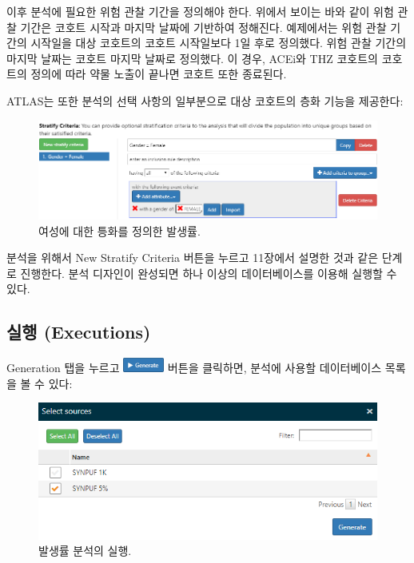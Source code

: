 \documentclass[11pt]{book}
\theoremstyle{definition}
\theoremstyle{definition}
\theoremstyle{definition}
\theoremstyle{remark}
\begin{document}
이후 분석에 필요한 위험 관찰 기간을 정의해야 한다. 위에서 보이는 바와
같이 위험 관찰 기간은 코호트 시작과 마지막 날짜에 기반하여 정해진다.
예제에서는 위험 관찰 기간의 시작일을 대상 코호트의 코호트 시작일보다 1일
후로 정의했다. 위험 관찰 기간의 마지막 날짜는 코호트 마지막 날짜로
정의했다. 이 경우, ACEi와 THZ 코호트의 코호트의 정의에 따라 약물 노출이
끝나면 코호트 또한 종료된다.

ATLAS는 또한 분석의 선택 사항의 일부분으로 대상 코호트의 층화 기능을
제공한다:

\begin{figure}

{\centering \includegraphics[width=1\linewidth]{images/Characterization/atlasIncidenceStratifyFemale} 

}

\caption{여성에 대한 틍화를 정의한 발생률.}\label{fig:atlasIncidenceStratifyFemale}
\end{figure}

분석을 위해서 New Stratify Criteria 버튼을 누르고 11장에서 설명한 것과
같은 단계로 진행한다. 분석 디자인이 완성되면 하나 이상의 데이터베이스를
이용해 실행할 수 있다.

\subsection{실행 (Executions)}\label{-executions-2}

Generation 탭을 누르고
\includegraphics{images/Characterization/atlasIncidenceGenerate.png}
버튼을 클릭하면, 분석에 사용할 데이터베이스 목록을 볼 수 있다:

\begin{figure}

{\centering \includegraphics[width=1\linewidth]{images/Characterization/atlasIncidenceSourceSelection} 

}

\caption{발생률 분석의 실행.}\label{fig:atlasIncidenceSourceSelection}
\end{figure}
\end{document}
